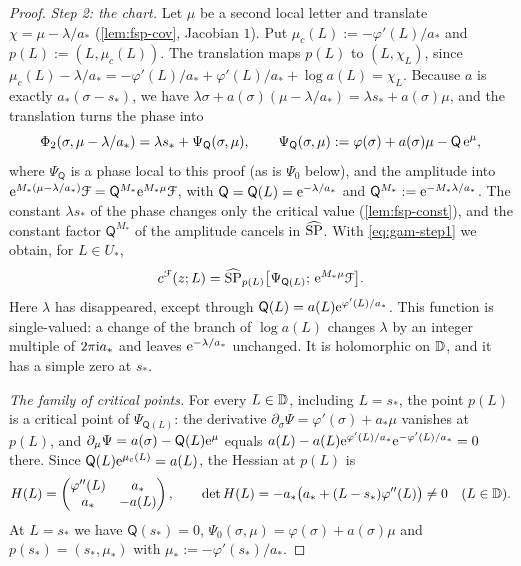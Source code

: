 \begin{proof}
\emph{Step 2: the chart.} Let $\mu$ be a second local letter and translate $\chi=\mu-\lambda/a_*$ (\cref{lem:fsp-cov}, Jacobian $1$). Put $\mu_c(L):=-\varphi'(L)/a_*$ and $p(L):=(L,\mu_c(L))$. The translation maps $p(L)$ to $(L,\chi_L)$, since $\mu_c(L)-\lambda/a_*=-\varphi'(L)/a_*+\varphi'(L)/a_*+\log a(L)=\chi_L$. Because $a$ is exactly $a_*(\sigma-s_*)$, we have $\lambda\sigma+a(\sigma)(\mu-\lambda/a_*)=\lambda s_*+a(\sigma)\mu$, and the translation turns the phase into
\[
\Phi_2(\sigma,\mu-\lambda/a_*)=\lambda s_*+\Psi_{\mathsf Q}(\sigma,\mu),\qquad \Psi_{\mathsf Q}(\sigma,\mu):=\varphi(\sigma)+a(\sigma)\mu-\mathsf Q\,\mathrm{e}^{\mu},
\]
where $\Psi_{\mathsf Q}$ is a phase local to this proof (as is $\Psi_0$ below), and the amplitude into $\mathrm{e}^{M_*(\mu-\lambda/a_*)}\mathcal{F}=\mathsf Q^{M_*}\mathrm{e}^{M_*\mu}\mathcal{F}$, with $\mathsf Q=\mathsf Q(L)=\mathrm{e}^{-\lambda/a_*}$ and $\mathsf Q^{M_*}:=\mathrm{e}^{-M_*\lambda/a_*}$. The constant $\lambda s_*$ of the phase changes only the critical value (\cref{lem:fsp-const}), and the constant factor $\mathsf Q^{M_*}$ of the amplitude cancels in $\widehat{\mathrm{SP}}$. With \eqref{eq:gam-step1} we obtain, for $L\in U_*$,
\begin{equation}
\label{eq:gam-chart}
c^{\mathcal{F}}(z;L)=\widehat{\mathrm{SP}}_{p(L)}\bigl[\Psi_{\mathsf Q(L)};\,\mathrm{e}^{M_*\mu}\mathcal{F}\bigr].
\end{equation}
Here $\lambda$ has disappeared, except through $\mathsf Q(L)=a(L)\mathrm{e}^{\varphi'(L)/a_*}$. This function is single-valued: a change of the branch of $\log a(L)$ changes $\lambda$ by an integer multiple of $2\pi\mathrm{i} a_*$ and leaves $\mathrm{e}^{-\lambda/a_*}$ unchanged. It is holomorphic on $\mathbb{D}$, and it has a simple zero at $s_*$.

\emph{The family of critical points.} For every $L\in\mathbb{D}$, including $L=s_*$, the point $p(L)$ is a critical point of $\Psi_{\mathsf Q(L)}$: the derivative $\partial_\sigma\Psi=\varphi'(\sigma)+a_*\mu$ vanishes at $p(L)$, and $\partial_\mu\Psi=a(\sigma)-\mathsf Q(L)\mathrm{e}^{\mu}$ equals $a(L)-a(L)\mathrm{e}^{\varphi'(L)/a_*}\mathrm{e}^{-\varphi'(L)/a_*}=0$ there. Since $\mathsf Q(L)\mathrm{e}^{\mu_c(L)}=a(L)$, the Hessian at $p(L)$ is
\[
H(L)=\begin{pmatrix}\varphi''(L)&a_*\\ a_*&-a(L)\end{pmatrix},\qquad \det H(L)=-a_*\bigl(a_*+(L-s_*)\varphi''(L)\bigr)\neq 0\quad(L\in\mathbb{D}).
\]
At $L=s_*$ we have $\mathsf Q(s_*)=0$, $\Psi_0(\sigma,\mu)=\varphi(\sigma)+a(\sigma)\mu$ and $p(s_*)=(s_*,\mu_*)$ with $\mu_*:=-\varphi'(s_*)/a_*$.


\end{proof}
